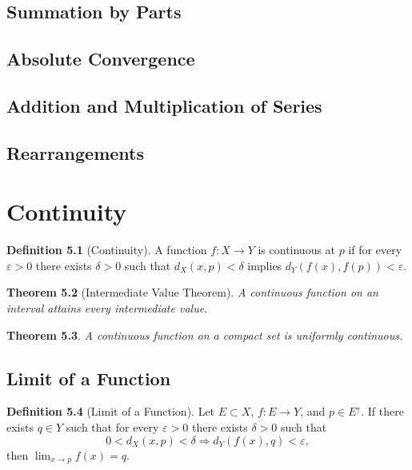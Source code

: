 \documentclass[11pt]{book}
\theoremstyle{definition}
\newtheorem{definition}{Definition}[chapter]
\theoremstyle{plain}
\newtheorem{theorem}[definition]{Theorem}
\begin{document}
\section{Summation by Parts}

\section{Absolute Convergence}

\section{Addition and Multiplication of Series}

\section{Rearrangements}

\chapter{Continuity}

\begin{definition}[Continuity]
A function $f:X\to Y$ is continuous at $p$ if for every $\varepsilon>0$ there exists $\delta>0$
such that $d_X(x,p)<\delta$ implies $d_Y(f(x),f(p))<\varepsilon$.
\end{definition}

\begin{theorem}[Intermediate Value Theorem]
A continuous function on an interval attains every intermediate value.
\end{theorem}

\begin{theorem}
A continuous function on a compact set is uniformly continuous.
\end{theorem}

\section{Limit of a Function}

\begin{definition}[Limit of a Function]
Let $E \subset X$, $f:E\to Y$, and $p \in E^\uparrow$.
If there exists $q \in Y$ such that for every $\varepsilon>0$
there exists $\delta>0$ such that
\[
0 < d_X(x,p) < \delta \Rightarrow d_Y(f(x),q) < \varepsilon,
\]
then $\lim_{x\to p} f(x)=q$.
\end{definition}
\end{document}
